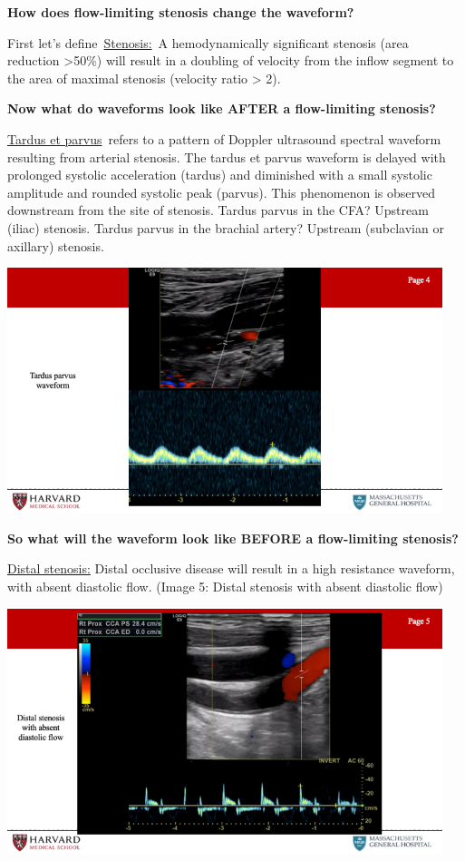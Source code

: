 \documentclass[
]{book}
\begin{document}
\textbf{How does flow-limiting stenosis change the waveform?}

First let's define~\underline{Stenosis:}~A hemodynamically significant
stenosis (area reduction \textgreater50\%) will result in a doubling of velocity
from the inflow segment to the area of maximal stenosis (velocity ratio
\textgreater{} 2).

\textbf{Now what do waveforms look like AFTER a flow-limiting stenosis?}

\underline{Tardus et parvus}~refers to a pattern of Doppler ultrasound
spectral waveform resulting from arterial stenosis. The tardus et parvus
waveform is delayed with prolonged systolic acceleration (tardus) and
diminished with a small systolic amplitude and rounded systolic peak
(parvus). This phenomenon is observed downstream from the site of
stenosis. Tardus parvus in the CFA? Upstream (iliac) stenosis. Tardus
parvus in the brachial artery? Upstream (subclavian or axillary)
stenosis.

\includegraphics[width=5in]{images/vasc_lab/Slide5}

\textbf{So what will the waveform look like BEFORE a flow-limiting stenosis?}

\underline{Distal stenosis:} Distal occlusive disease will result in a high
resistance waveform, with absent diastolic flow. (Image 5: Distal
stenosis with absent diastolic flow)

\includegraphics[width=5in]{images/vasc_lab/Slide6}
\end{document}
